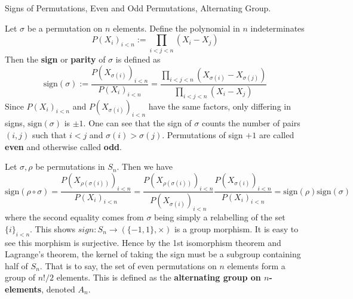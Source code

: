 \documentclass[../../book.tex]{subfiles}
\begin{document}
\begin{dfn} Signs of Permutations, Even and Odd Permutations, Alternating Group. 
    
    Let $\sigma$ be a permutation on $n$ elements. 
    Define the polynomial in $n$ indeterminates
    \[
        P(X_i)_{i<n} := \prod_{i<j<n} (X_i - X_j)
    \]
    Then the \textbf{sign} or \textbf{parity} of $\sigma$ is defined as \[
        \mathrm{sign}(\sigma) := \frac{P(X_{\sigma(i)})_{i<n}}{P(X_i)_{i<n}} =
        \frac{\prod_{i<j<n} (X_{\sigma (i)} - X_{\sigma (j)})}
        {\prod_{i<j<n} (X_i - X_j)}
    \]
    Since $P(X_i)_{i<n}$ and $P(X_{\sigma(i)})_{i<n}$ have the same factors,
    only differing in signs, $\mathrm{sign}(\sigma)$ is $\pm 1$. 
    One can see that the sign of $\sigma$ counts
    the number of pairs $(i,j)$ such that $i < j$ and $\sigma(i) > \sigma(j)$. 
    Permutations of sign $+1$ are called \textbf{even} 
    and otherwise called \textbf{odd}.
    
    Let $\sigma, \rho$ be permutations in $S_n$. 
    Then we have \[
        \mathrm{sign}(\rho \circ \sigma) = \frac{P(X_{\rho(\sigma(i))})_{i<n}}{P(X_i)_{i<n}}
        = \frac{P(X_{\rho(\sigma(i))})_{i<n}}{P(X_{\sigma(i)})_{i<n}}
        \frac{P(X_{\sigma(i)})_{i<n}}{P(X_i)_{i<n}} 
        = \mathrm{sign}(\rho) \mathrm{sign}(\sigma)
    \]
    where the second equality comes from $\sigma$ being simply
    a relabelling of the set $\{i\}_{i<n}$. 
    This shows $sign : S_n \to (\{-1,1\},\times)$ is a group morphism. 
    It is easy to see this morphism is surjective. 
    Hence by the 1st isomorphism theorem and Lagrange's theorem, 
    the kernel of taking the sign must be a subgroup containing half of $S_n$. 
    That is to say, the set of even permutations on $n$ elements
    form a group of $n!/2$ elements.
    This is defined as the \textbf{alternating group on $n$-elements}, denoted $A_n$.
\end{dfn}
\end{document}
